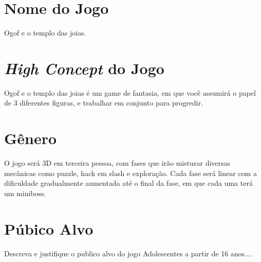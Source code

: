 \section{Nome do Jogo}
Ogof e o templo das joias.

\section{\textit{High Concept} do Jogo}
Ogof e o templo das joias é um game de fantasia, em que você assumirá o papel de 3 diferentes figuras, e trabalhar em conjunto para progredir.



\section{Gênero}

O jogo será 3D em terceira pessoa, com fases que irão misturar diversas mecânicas como puzzle, hack em slash e exploração. Cada fase será linear com a dificuldade gradualmente aumentada até o final da fase, em que cada uma terá um miniboss.


\section{Púbico Alvo}

Descreva e justifique o publico alvo do jogo
Adolescentes a partir de 16 anos....
\vfill
\pagebreak

